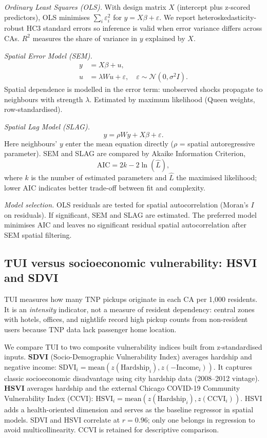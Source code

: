 \documentclass[10pt, a4paper]{article}
\begin{document}
\textit{Ordinary Least Squares (OLS).}\label{sec:regression}
With design matrix $X$ (intercept plus z-scored predictors), OLS minimises $\sum_i \varepsilon_i^2$ for $y = X\beta + \varepsilon$. We report heteroskedasticity-robust HC3 standard errors so inference is valid when error variance differs across CAs. $R^2$ measures the share of variance in $y$ explained by $X$.

\textit{Spatial Error Model (SEM).}
\begin{align}
    y &= X\beta + u, \\
    u &= \lambda W u + \varepsilon, \quad \varepsilon \sim \mathcal{N}(0, \sigma^2 I).
\end{align}
Spatial dependence is modelled in the error term: unobserved shocks propagate to neighbours with strength $\lambda$. Estimated by maximum likelihood (Queen weights, row-standardised).

\textit{Spatial Lag Model (SLAG).}
\begin{equation}
    y = \rho W y + X\beta + \varepsilon.
\end{equation}
Here neighbours' $y$ enter the mean equation directly ($\rho$ = spatial autoregressive parameter). SEM and SLAG are compared by Akaike Information Criterion,
\begin{equation}
    \mathrm{AIC} = 2k - 2\ln(\hat{L}),
\end{equation}
where $k$ is the number of estimated parameters and $\hat{L}$ the maximised likelihood; lower AIC indicates better trade-off between fit and complexity.

\textit{Model selection.} OLS residuals are tested for spatial autocorrelation (Moran's $I$ on residuals). If significant, SEM and SLAG are estimated. The preferred model minimises AIC and leaves no significant residual spatial autocorrelation after SEM spatial filtering.

\subsection{TUI versus socioeconomic vulnerability: HSVI and SDVI}
TUI measures how many TNP pickups originate in each CA per 1{,}000 residents. It is an \emph{intensity} indicator, not a measure of resident dependency: central zones with hotels, offices, and nightlife record high pickup counts from non-resident users because TNP data lack passenger home location.

We compare TUI to two composite vulnerability indices built from z-standardised inputs. \textbf{SDVI} (Socio-Demographic Vulnerability Index) averages hardship and negative income: $\mathrm{SDVI}_i = \mathrm{mean}(z(\mathrm{Hardship}_i), z(-\mathrm{Income}_i))$. It captures classic socioeconomic disadvantage using city hardship data (2008--2012 vintage). \textbf{HSVI} averages hardship and the external Chicago COVID-19 Community Vulnerability Index (CCVI): $\mathrm{HSVI}_i = \mathrm{mean}(z(\mathrm{Hardship}_i), z(\mathrm{CCVI}_i))$. HSVI adds a health-oriented dimension and serves as the baseline regressor in spatial models. SDVI and HSVI correlate at $r=0.96$; only one belongs in regression to avoid multicollinearity. CCVI is retained for descriptive comparison.
\end{document}
